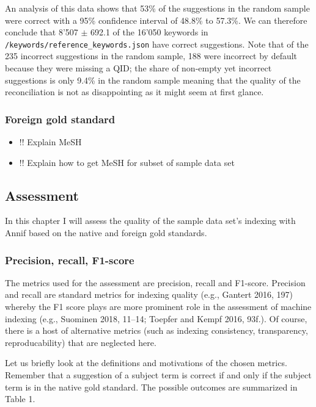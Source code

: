 An analysis of this data shows that 53\% of the suggestions in the
random sample were correct with a 95\% confidence interval of 48.8\% to
57.3\%. We can therefore conclude that 8'507 \(\pm\) 692.1 of the 16'050
keywords in \texttt{/keywords/reference\_keywords.json} have correct
suggestions. Note that of the 235 incorrect suggestions in the random
sample, 188 were incorrect by default because they were missing a QID;
the share of non-empty yet incorrect suggestions is only 9.4\% in the
random sample meaning that the quality of the reconciliation is not as
disappointing as it might seem at first glance.

\hypertarget{foreign-gold-standard}{%
\subsubsection{Foreign gold standard}\label{foreign-gold-standard}}

\begin{itemize}
\tightlist
\item
  !! Explain MeSH
\item
  !! Explain how to get MeSH for subset of sample data set
\end{itemize}

\hypertarget{assessment}{%
\subsection{Assessment}\label{assessment}}

In this chapter I will assess the quality of the sample data set's
indexing with Annif based on the native and foreign gold standards.

\hypertarget{precision-recall-f1-score}{%
\subsubsection{Precision, recall,
F1-score}\label{precision-recall-f1-score}}

The metrics used for the assessment are precision, recall and F1-score.
Precision and recall are standard metrics for indexing quality (e.g.,
Gantert 2016, 197) whereby the F1 score plays are more prominent role in
the assessment of machine indexing (e.g., Suominen 2018, 11--14; Toepfer
and Kempf 2016, 93f.). Of course, there is a host of alternative metrics
(such as indexing consistency, transparency, reproducability) that are
neglected here.

Let us briefly look at the definitions and motivations of the chosen
metrics. Remember that a suggestion of a subject term is correct if and
only if the subject term is in the native gold standard. The possible
outcomes are summarized in Table 1.

